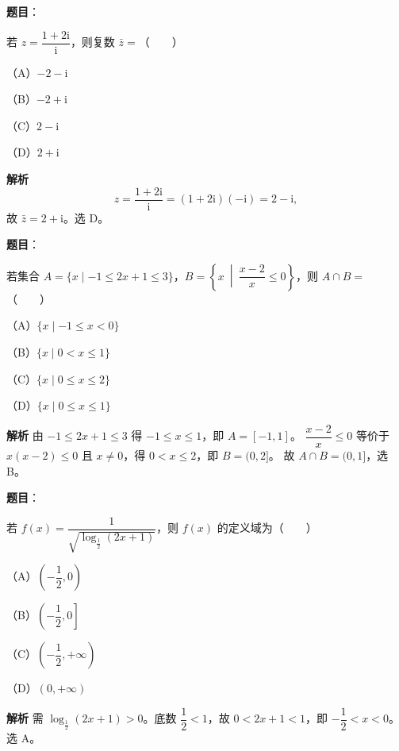 
\begin{answer}

\textbf{题目}：

若 $z=\dfrac{1+2\mathrm i}{\mathrm i}$，则复数 $\bar z=$\mbox{（　　）}

（A）$-2-\mathrm i$

（B）$-2+\mathrm i$

（C）$2-\mathrm i$

（D）$2+\mathrm i$

\textbf{解析}
\nopagebreak[4]
\[z=\frac{1+2\mathrm i}{\mathrm i}=(1+2\mathrm i)(-\mathrm i)=2-\mathrm i,\]
故 $\bar z=2+\mathrm i$。选 D。


\end{answer}
\begin{answer}

\textbf{题目}：

若集合 $A=\{x\mid -1\leqslant2x+1\leqslant3\}$，$B=\left\{x\ \middle|\ \dfrac{x-2}{x}\leqslant0\right\}$，则 $A\cap B=$\mbox{（　　）}

（A）$\{x\mid -1\leqslant x<0\}$

（B）$\{x\mid 0<x\leqslant1\}$

（C）$\{x\mid 0\leqslant x\leqslant2\}$

（D）$\{x\mid 0\leqslant x\leqslant1\}$

\textbf{解析}
由 $-1\leqslant2x+1\leqslant3$ 得 $-1\leqslant x\leqslant1$，即 $A=[-1,1]$。
$\dfrac{x-2}{x}\leqslant0$ 等价于 $x(x-2)\leqslant0$ 且 $x\neq0$，得 $0<x\leqslant2$，即 $B=(0,2]$。
故 $A\cap B=(0,1]$，选 B。


\end{answer}
\begin{answer}

\textbf{题目}：

若 $f(x)=\dfrac1{\sqrt{\log_{\frac12}(2x+1)}}$，则 $f(x)$ 的定义域为\mbox{（　　）}

（A）$\left(-\dfrac12,0\right)$

（B）$\left(-\dfrac12,0\right]$

（C）$\left(-\dfrac12,+\infty\right)$

（D）$(0,+\infty)$

\textbf{解析}
需 $\log_{\frac12}(2x+1)>0$。底数 $\dfrac12<1$，故 $0<2x+1<1$，即 $-\dfrac12<x<0$。选 A。


\end{answer}
